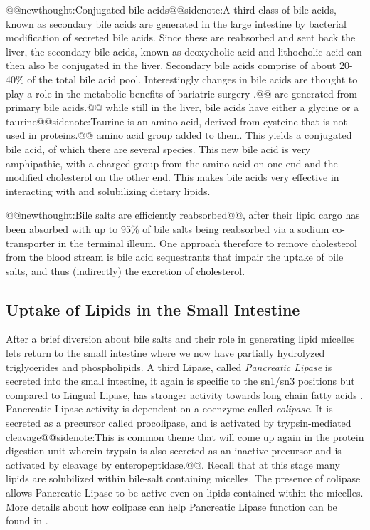 \documentclass{tufte-handout}
\makeatletter
\def\newthought#1{@@newthought:#1@@}
\def\sidenote#1{@@sidenote:#1@@}
\makeatother
\begin{document}
\newthought{Conjugated bile acids\sidenote{A third class of bile acids, known as secondary bile acids are generated in the large intestine by bacterial modification of secreted bile acids.  Since these are reabsorbed and sent back the liver, the secondary bile acids, known as deoxycholic acid and lithocholic acid can then also be conjugated in the liver.  Secondary bile acids comprise of about 20-40\% of the total bile acid pool.  Interestingly changes in bile acids are thought to play a role in the metabolic benefits of bariatric surgery \citep{Evers2017a}.} are generated from primary bile acids.}  while still in the liver, bile acids have either a glycine or a taurine\sidenote{Taurine is an amino acid, derived from cysteine that is not used in proteins.} amino acid group added to them.  This yields a conjugated bile acid, of which there are several species.  This new bile acid is very amphipathic, with a charged group from the amino acid on one end and the modified cholesterol on the other end.  This makes bile acids very effective in interacting with and solubilizing dietary lipids.

\newthought{Bile salts are efficiently reabsorbed}, after their lipid cargo has been absorbed with up to 95\% of bile salts being reabsorbed via a sodium co-transporter in the terminal illeum.  One approach therefore to remove cholesterol from the blood stream is bile acid sequestrants that impair the uptake of bile salts, and thus (indirectly) the excretion of cholesterol.

\subsection{Uptake of Lipids in the Small Intestine}

After a brief diversion about bile salts and their role in generating lipid micelles lets return to the small intestine where we now have partially hydrolyzed triglycerides and phospholipids.  A third Lipase, called \emph{Pancreatic Lipase} is secreted into the small intestine, it again is specific to the sn1/sn3 positions but compared to Lingual Lipase, has stronger activity towards long chain fatty acids \citep{Jensen1983}.  Pancreatic Lipase activity is dependent on a coenzyme called \emph{colipase}.  It is secreted as a precursor called procolipase, and is activated by trypsin-mediated cleavage\sidenote{This is common theme that will come up again in the protein digestion unit wherein trypsin is also secreted as an inactive precursor and is activated by cleavage by enteropeptidase.}.  Recall that at this stage many lipids are solubilized within bile-salt containing micelles.  The presence of colipase allows Pancreatic Lipase to be active even on lipids contained within the micelles.  More details about how colipase can help Pancreatic Lipase function can be found in \citet{VanTilbeurgh1999}.
\end{document}
